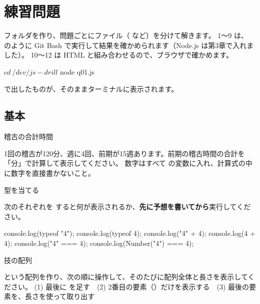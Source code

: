 \section{練習問題}

 フォルダを作り、問題ごとにファイル（ など）を分けて解きます。
1〜9 は、 のように Git Bash で実行して結果を確かめられます（Node.js は第3章で入れました）。
10〜12 は HTML と組み合わせるので、ブラウザで確かめます。

\begin{tip}
\begin{terminal}
$ cd ~/dev/js-drill
$ node q01.js
\end{terminal}
 で出したものが、そのままターミナルに表示されます。
\end{tip}

\subsection*{基本}

\begin{exercise}[1]{稽古の合計時間}
\toanswer\par
1回の稽古が120分、週に4回、前期が15週あります。前期の稽古時間の合計を「分」で計算して表示してください。
数字はすべて  の変数に入れ、計算式の中に数字を直接書かないこと。
\end{exercise}

\begin{exercise}[1]{型を当てる}
\toanswer\par
次のそれぞれを  すると何が表示されるか、\textbf{先に予想を書いてから}実行してください。
\begin{Piton}[language=code]
console.log(typeof "4");
console.log(typeof 4);
console.log("4" + 4);
console.log(4 + 4);
console.log("4" === 4);
console.log(Number("4") === 4);
\end{Piton}
\end{exercise}

\begin{exercise}[1]{技の配列}
\toanswer\par
\code{["面", "小手", "胴"]} という配列を作り、次の順に操作して、そのたびに配列全体と長さを表示してください。
(1) 最後に  を足す　(2) 2番目の要素（）だけを表示する　(3) 最後の要素を、長さを使って取り出す
\end{exercise}


